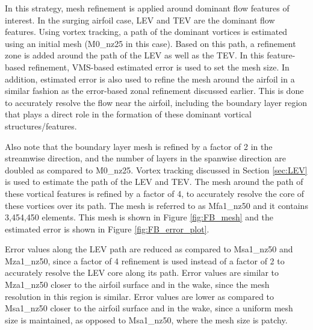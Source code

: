 In this strategy, mesh refinement is applied around dominant flow features of interest. 
In the surging airfoil case, LEV and TEV are the dominant flow features. 
Using vortex tracking, a path of the dominant vortices is estimated using an initial mesh (M0\_nz25 in this case). 
Based on this path, a refinement zone is added around the path of the LEV as well as the TEV. 
In this feature-based refinement, VMS-based estimated error is used to set the mesh size. 
In addition, estimated error is also used to refine the mesh around the airfoil in a similar fashion as the error-based zonal refinement discussed earlier. 
This is done to accurately resolve the flow near the airfoil, including the boundary layer region that plays a direct role in the formation of these dominant vortical structures/features.

Also note that the boundary layer mesh is refined by a factor of 2 in the streamwise direction, and the number of layers in the spanwise direction are doubled as compared to M0\_nz25.  
Vortex tracking discussed in Section \ref{sec:LEV} is used to estimate the path of the LEV and TEV. 
The mesh around the path of these vortical features is refined by a factor of 4, to accurately resolve the core of these vortices over its path. 
The mesh is referred to as Mfa1\_nz50 and it contains 3,454,450 elements.
This mesh is shown in Figure \ref{fig:FB_mesh} and the estimated error is shown in Figure \ref{fig:FB_error_plot}.

Error values along the LEV path are reduced as compared to Msa1\_nz50 and Mza1\_nz50, since a factor of 4 refinement is used instead of a factor of 2 to accurately resolve the LEV core along its path.
Error values are similar to Mza1\_nz50 closer to the airfoil surface and in the wake, since the mesh resolution in this region is similar.
Error values are lower as compared to Msa1\_nz50 closer to the airfoil surface and in the wake, since a uniform mesh size is maintained, as opposed to Msa1\_nz50, where the mesh size is patchy.


